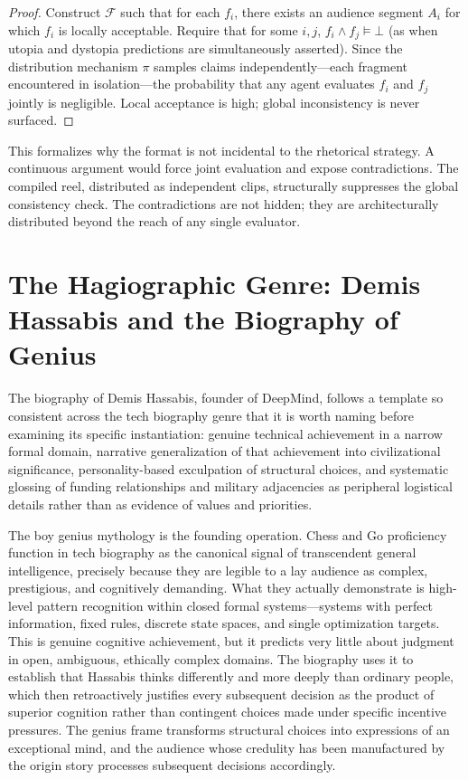 \documentclass[12pt, a4paper]{article}
\begin{document}
\begin{proof}
Construct $\mathcal{F}$ such that for each $f_i$, there exists an audience segment $A_i$ for which
$f_i$ is locally acceptable. Require that for some $i, j$, $f_i \wedge f_j \models \bot$ (as when
utopia and dystopia predictions are simultaneously asserted). Since the distribution mechanism
$\pi$ samples claims independently---each fragment encountered in isolation---the probability that
any agent evaluates $f_i$ and $f_j$ jointly is negligible. Local acceptance is high; global
inconsistency is never surfaced.
\end{proof}

This formalizes why the format is not incidental to the rhetorical strategy. A continuous argument
would force joint evaluation and expose contradictions. The compiled reel, distributed as
independent clips, structurally suppresses the global consistency check. The contradictions are not
hidden; they are architecturally distributed beyond the reach of any single evaluator.

\section{The Hagiographic Genre: Demis Hassabis and the Biography of Genius}

The biography of Demis Hassabis, founder of DeepMind, follows a template so consistent across the
tech biography genre that it is worth naming before examining its specific instantiation: genuine
technical achievement in a narrow formal domain, narrative generalization of that achievement into
civilizational significance, personality-based exculpation of structural choices, and systematic
glossing of funding relationships and military adjacencies as peripheral logistical details rather
than as evidence of values and priorities.

The boy genius mythology is the founding operation. Chess and Go proficiency function in tech
biography as the canonical signal of transcendent general intelligence, precisely because they are
legible to a lay audience as complex, prestigious, and cognitively demanding. What they actually
demonstrate is high-level pattern recognition within closed formal systems---systems with perfect
information, fixed rules, discrete state spaces, and single optimization targets. This is genuine
cognitive achievement, but it predicts very little about judgment in open, ambiguous, ethically
complex domains. The biography uses it to establish that Hassabis thinks differently and more
deeply than ordinary people, which then retroactively justifies every subsequent decision as the
product of superior cognition rather than contingent choices made under specific incentive
pressures. The genius frame transforms structural choices into expressions of an exceptional mind,
and the audience whose credulity has been manufactured by the origin story processes subsequent
decisions accordingly.
\end{document}
